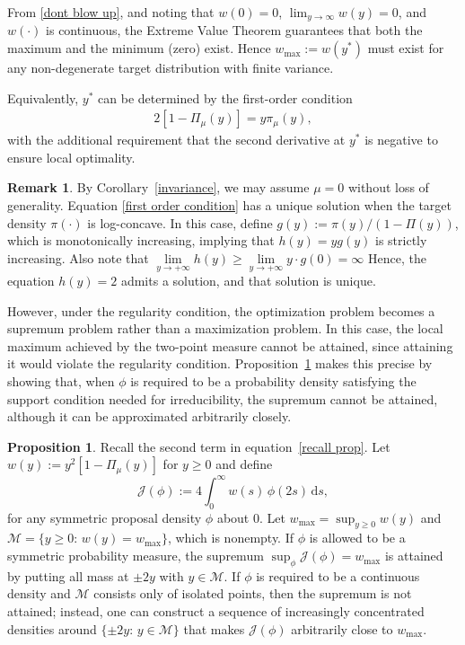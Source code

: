 \documentclass[conference]{IEEEtran}
\newcommand{\df}{\mathrm{d}}
\theoremstyle{definition}
\newtheorem{proposition}[theorem]{Proposition}
\newtheorem{remark}[theorem]{Remark}
\begin{document}
From \eqref{dont blow up}, and noting that $w(0)=0$, $\lim_{y\to\infty}w(y)=0$, and $w(\cdot)$ is continuous, the Extreme Value Theorem guarantees that both the maximum and the minimum (zero) exist. Hence $w_{\max}:=w(y^*)$ must exist for any non-degenerate target distribution with finite variance.

Equivalently, $y^*$ can be determined by the first-order condition
\begin{align}\label{first order condition}
2[1-\Pi_\mu(y)] = y\pi_\mu(y),
\end{align}
with the additional requirement that the second derivative at $y^*$ is negative to ensure local optimality. 

\begin{remark}
By Corollary~\ref{invariance}, we may assume $\mu = 0$ without loss of generality. Equation \eqref{first order condition} has a unique solution when the target density $\pi(\cdot)$ is log-concave.  
In this case, define $g(y):=\pi(y)/(1-\Pi(y))$, which is monotonically increasing, implying that $h(y)=y g(y)$ is strictly increasing. Also note that \(\lim\limits_{y\to+\infty} h(y)
\ge
\lim\limits_{y\to+\infty} y\cdot g(0)
= \infty\)
Hence, the equation $h(y)=2$ admits a solution, and that solution is unique.
\end{remark}

However, under the regularity condition, the optimization problem becomes a supremum problem rather than a maximization problem. In this case, the local maximum achieved by the two-point measure cannot be attained, since attaining it would violate the regularity condition. Proposition~\ref{cant attain} makes this precise by showing that,
when $\phi$ is required to be a probability density satisfying the
support condition needed for irreducibility, the supremum cannot be
attained, although it can be approximated arbitrarily closely.


\begin{proposition}\label{cant attain}
Recall the second term in equation~\eqref{recall prop}. Let $w(y):=y^2[1-\Pi_\mu(y)]$ for $y\ge 0$ and define
\[
\mathcal{J}(\phi):=4\int_{0}^{\infty} w(s)\,\phi(2s)\,\df s,
\]
for any symmetric proposal density $\phi$ about $0$. 
Let $w_{\max}=\sup_{y\ge 0} w(y)$ and 
$\mathcal{M}=\{y\ge 0:\,w(y)=w_{\max}\}$, which is nonempty. 
If $\phi$ is allowed to be a symmetric probability measure, 
the supremum $\sup_\phi\mathcal{J}(\phi)=w_{\max}$ is attained by putting all mass at $\pm 2y$ with $y\in\mathcal{M}$. 
If $\phi$ is required to be a continuous density and $\mathcal{M}$ consists only of isolated points, then the supremum is not attained; 
instead, one can construct a sequence of increasingly concentrated densities around $\{\pm 2y:\,y\in\mathcal{M}\}$ that makes $\mathcal{J}(\phi)$ arbitrarily close to $w_{\max}$.

\end{proposition}
\end{document}
